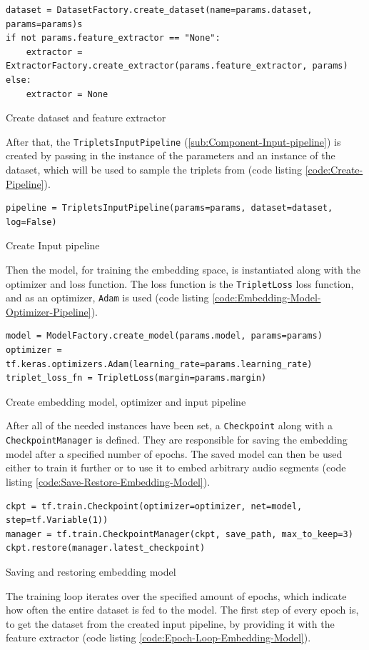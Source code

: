 \begin{code}[H]
\begin{verbatim}
dataset = DatasetFactory.create_dataset(name=params.dataset, params=params)s
if not params.feature_extractor == "None":
    extractor = ExtractorFactory.create_extractor(params.feature_extractor, params)
else:
    extractor = None
\end{verbatim}
\caption{Create dataset and feature extractor}
\label{code:Create-Dataset-Extractor}
\end{code}
\noindent
After that, the \texttt{TripletsInputPipeline} (\ref{sub:Component-Input-pipeline}) is created by passing in the instance of the parameters and an instance of the dataset, which will be used to sample the triplets from (code listing \ref{code:Create-Pipeline}).

\begin{code}[H]
\begin{verbatim}
pipeline = TripletsInputPipeline(params=params, dataset=dataset, log=False)
\end{verbatim}
\caption{Create Input pipeline}
\label{code:Create-Pipeline}
\end{code}
\noindent
Then the model, for training the embedding space, is instantiated along with the optimizer and loss function. The loss function is the \texttt{TripletLoss} loss function, and as an optimizer, \texttt{Adam} is used (code listing \ref{code:Embedding-Model-Optimizer-Pipeline}).

\begin{code}[H]
\begin{verbatim}
model = ModelFactory.create_model(params.model, params=params)
optimizer = tf.keras.optimizers.Adam(learning_rate=params.learning_rate)
triplet_loss_fn = TripletLoss(margin=params.margin)
\end{verbatim}
\caption{Create embedding model, optimizer and input pipeline}
\label{code:Embedding-Model-Optimizer-Pipeline}
\end{code}
\noindent
After all of the needed instances have been set, a \texttt{Checkpoint} along with a \texttt{CheckpointManager} is defined. They are responsible for saving the embedding model after a specified number of epochs. The saved model can then be used either to train it further or to use it to embed arbitrary audio segments (code listing \ref{code:Save-Restore-Embedding-Model}).

\begin{code}[H]
\begin{verbatim}
ckpt = tf.train.Checkpoint(optimizer=optimizer, net=model, step=tf.Variable(1))
manager = tf.train.CheckpointManager(ckpt, save_path, max_to_keep=3)
ckpt.restore(manager.latest_checkpoint)
\end{verbatim}
\caption{Saving and restoring embedding model}
\label{code:Save-Restore-Embedding-Model}
\end{code}
\noindent
The training loop iterates over the specified amount of epochs, which indicate how often the entire dataset is fed to the model. The first step of every epoch is, to get the dataset from the created input pipeline, by providing it with the feature extractor (code listing \ref{code:Epoch-Loop-Embedding-Model}).

